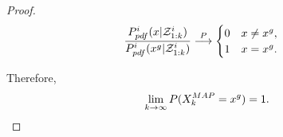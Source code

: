 \begin{proof}
		\small\begin{equation*}
		\frac{P^i_{pdf}(x|\mathcal{Z}^i_{1:k})}{P^i_{pdf}(x^g|\mathcal{Z}^i_{1:k})}\overset{P}{\longrightarrow}
		\begin{cases}
		0\quad x\neq x^g,\\
		1\quad x= x^g.
		\end{cases}		
		\end{equation*}\normalsize
		
		Therefore,
		\small\begin{equation*}
		\lim\limits_{k\rightarrow \infty}
		P(X_k^{MAP}=x^g)=1.
		\end{equation*}\normalsize		
		
	\end{proof}
	
%	


